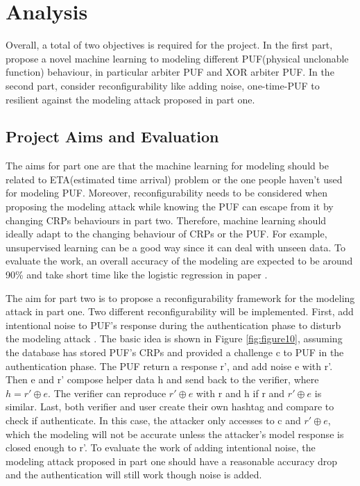 \chapter{Analysis}
Overall, a total of two objectives is required for the project. In the first part, propose a novel machine learning to modeling different PUF(physical unclonable function)
behaviour, in particular arbiter PUF and XOR arbiter PUF. In the second part, consider reconfigurability like adding noise, one-time-PUF to resilient against the modeling attack
proposed in part one.

\section{Project Aims and Evaluation}
The aims for part one are that the machine learning for modeling should be related to ETA(estimated time arrival) problem or the one people haven't used for modeling
PUF. Moreover, reconfigurability needs to be considered when proposing the modeling attack while knowing the PUF can escape from it by changing CRPs behaviours in part 
two. Therefore, machine learning should ideally adapt to the changing behaviour of CRPs or the PUF. For example, unsupervised learning can be a good way since it can 
deal with unseen data. To evaluate the work, an overall accuracy of the modeling are expected to be around 90\% and take short time like the logistic regression in 
paper \cite{Reference6}.

The aim for part two is to propose a reconfigurability framework for the modeling attack in part one. Two different reconfigurability will be implemented. First, add intentional
noise to PUF's response during the authentication phase to disturb the modeling attack \cite{Reference8}. The basic idea is shown in Figure \ref{fig:figure10}, assuming the database has stored PUF's CRPs and provided a challenge c
to PUF in the authentication phase. The PUF return a response r', and add noise e with r'. Then e and r' compose helper data h and send back to the verifier, where $h = r'\oplus e$. The verifier can reproduce $r'\oplus e$  
with r and h if r and $r'\oplus e$ is similar. Last, both verifier and user create their own hashtag and compare to check if authenticate. In this case, the attacker only accesses to c and $r'\oplus e$, which the modeling
will not be accurate unless the attacker's model response is closed enough to r'. To evaluate the work of adding intentional noise, the modeling attack proposed in part one should have a reasonable accuracy drop and the authentication will still work 
though noise is added.

